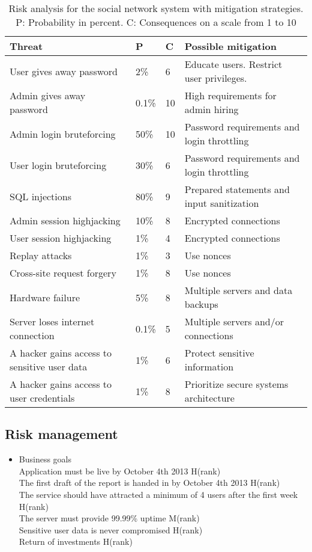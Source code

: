 \documentclass[a4paper]{article}
\begin{document}
\begin{table}[h]
	\begin{tabular}{| p{5cm} | l | l | p{5cm} |}
		\hline
		\textbf{Threat} & \textbf{P} & \textbf{C} & \textbf{Possible mitigation} \\ \hline
		User gives away password & 2\% & 6 & Educate users. Restrict user privileges. \\ \hline
        Admin gives away password & 0.1\%  & 10 & High requirements for admin hiring \\ \hline
        Admin login bruteforcing & 50\% & 10 & Password requirements and login throttling \\ \hline
        User login bruteforcing & 30\% & 6 & Password requirements and login throttling \\ \hline
        SQL injections & 80\% & 9 & Prepared statements and input sanitization \\ \hline
        Admin session highjacking & 10\% & 8 & Encrypted connections \\ \hline
        User session highjacking & 1\% & 4 & Encrypted connections \\ \hline
        Replay attacks & 1\% & 3 & Use nonces \\ \hline
       	Cross-site request forgery & 1\% & 8 & Use nonces \\ \hline
        Hardware failure & 5\% & 8 & Multiple servers and data backups \\ \hline
        Server loses internet connection & 0.1\% & 5 & Multiple servers and/or connections \\ \hline
        A hacker gains access to sensitive user data & 1\% & 6 & Protect sensitive information \\ \hline
        A hacker gains access to user credentials & 1\% & 8 & Prioritize secure systems architecture \\ \hline
	\end{tabular}
	\caption{Risk analysis for the social network system with mitigation strategies. P: Probability in percent. C: Consequences on a scale from 1 to 10}
	\label{tab:risk_analysis}
\end{table}

\subsection{Risk management}
\begin{itemize}
\item {Business goals}\\
Application must be live by October 4th 2013	H(rank)\\
The first draft of the report is handed in by October 4th 2013	H(rank)\\
The service should have attracted a minimum of 4 users after the first week	H(rank)\\
The server must provide 99.99\% uptime	M(rank)\\
Sensitive user data is never compromised	H(rank)\\
Return of investments H(rank)\\
\end{itemize}
\end{document}
